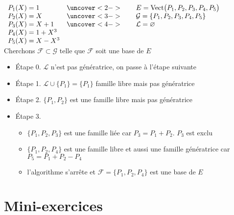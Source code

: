 \begin{frame}
\begin{exemple}

$
\begin{array}{ll}
P_1(X)=1  &\uncover<2->{\qquad E = \text{Vect}\big(P_1, P_2, P_3, P_4, P_5\big)}
\\ P_2(X)=X &\uncover<3->{\qquad \mathcal{G} = \{P_1, P_2, P_3, P_4, P_5\}}
\\ P_3(X)=X+1 &\uncover<4->{\qquad \mathcal{L} = \varnothing}
\\P_4(X)=1+X^3&\\ P_5(X)=X-X^3&
\end{array}
$
\\
\pause\pause\pause\pause
\medskip
{Cherchons
$\mathcal{F} \subset \mathcal{G}$ telle que $\mathcal{F}$ soit une base de $E$}

\pause
\begin{itemize} 
  \item \'Etape 0.  $\mathcal{L}$ n'est pas génératrice, 
  on passe à l'étape suivante

  \pause
  \item \'Etape 1. $ \mathcal{L} \cup \{ P_1 \} = \{ P_1 \}$ famille libre mais pas génératrice  
  \pause
  \item \'Etape 2. 
 $\{ P_1, P_2 \}$ est une famille libre mais pas génératrice 
  
  \pause
  \item \'Etape 3. \begin{itemize}
  \item
  $\{P_1, P_2, P_3 \}$ est une famille liée car $P_3 =  P_1 + P_2$. $P_3$ est exclu
  
  \pause
  \item
   $\{P_1, P_2, P_4\}$ 
  est une famille libre \pause
  et
  aussi une famille génératrice car   $P_5 = P_1+P_2-P_4$
  \pause
  \item l'algorithme s'arr\^ete et $\mathcal{F} = \{P_1, P_2, P_4\}$ est une base de $E$
  \end{itemize}
\end{itemize}  
\end{exemple}

\end{frame}


\section{Mini-exercices}

